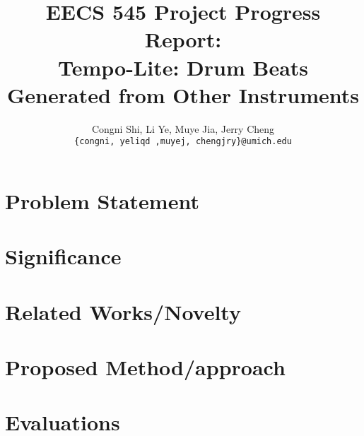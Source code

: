 \documentclass[11pt,letterpaper]{article}
\title{EECS 545 Project Progress Report: \\

        Tempo-Lite: Drum Beats Generated from Other Instruments}
\author{Congni Shi, Li Ye, Muye Jia, Jerry Cheng\\

        \texttt{\{congni, yeliqd ,muyej, chengjry\}@umich.edu}

}
\begin{document}
\maketitle

\section{Problem Statement}
    \label{sec:problem}
    
\section{Significance}
    \label{sec:significance}
    
\section{Related Works/Novelty}
    \label{sec:novelty}
    
\section{Proposed Method/approach}
    \label{sec:approach}
    

\section{Evaluations}
    \label{sec:eval}


\nocite{*}

\end{document}
